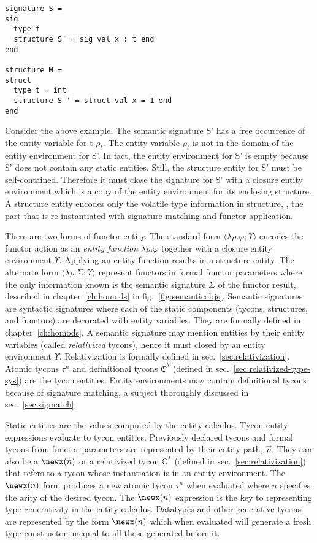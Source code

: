 \begin{lstlisting}
signature S = 
sig
  type t
  structure S' = sig val x : t end
end

structure M =
struct
  type t = int
  structure S ' = struct val x = 1 end
end
\end{lstlisting}

Consider the above example. The semantic signature S' has a free occurrence of the entity variable for t $\rho_t$. The entity variable $\rho_t$ is not in the domain of the entity environment for S'. In fact, the entity environment for S' is empty because S' does not contain any static entities. Still, the structure entity for S' must be self-contained. Therefore it must close the signature for S' with a closure entity environment which is a copy of the entity environment for its enclosing structure.  A structure entity encodes only the volatile type information in structure, \ie, the part that is re-instantiated with signature matching and functor application. 

There are two forms of functor entity. The standard form
$\langle\lambda\rho.\varphi;\Upsilon\rangle$ encodes the functor
action as an \emph{entity function} $\lambda\rho.\varphi$ together with a closure
entity environment $\Upsilon$. Applying an entity function results in a structure entity. The alternate form
$\langle\lambda\rho.\Sigma;\Upsilon\rangle$ 
represent functors in formal functor parameters where the
only information known is the semantic signature $\Sigma$ of the functor result, described in chapter~\ref{ch:homods} in fig.~\ref{fig:semanticobjs}. Semantic signatures
are syntactic signatures where each of the static
components (tycons, structures, and functors) are decorated with
entity variables. They are formally defined in chapter~\ref{ch:homods}. A semantic signature may mention entities by their entity variables (called \emph{relativized} tycons), hence it must closed by an entity environment $\Upsilon$. Relativization is formally defined in sec.~\ref{sec:relativization}. Atomic tycons
$\tau^n$ and definitional tycons $\mathfrak{C}^\lambda$
(defined in sec.~\ref{sec:relativized-type-sys}) are
the tycon entities. Entity environments may contain definitional tycons because of signature matching, a subject thoroughly discussed in sec.~\ref{sec:sigmatch}. 

Static entities are the values computed by the entity calculus. Tycon entity expressions evaluate to tycon entities. Previously declared tycons and formal tycons from functor parameters are represented by their entity path, $\vec{\rho}$. They can also be a $\newx(n)$ or a relativized tycon $\mathbb{C}^\lambda$ (defined in sec.~\ref{sec:relativization}) that refers to a tycon whose instantiation is in an entity environment. The $\newx(n)$ form produces a new atomic tycon $\tau^n$ when evaluated where $n$ specifies the arity of the desired tycon. The $\newx(n)$ expression is the key to representing type generativity in the entity calculus. Datatypes and other generative tycons are represented by the form $\newx(n)$ which when evaluated will generate a fresh type constructor unequal to all those generated before it. 


